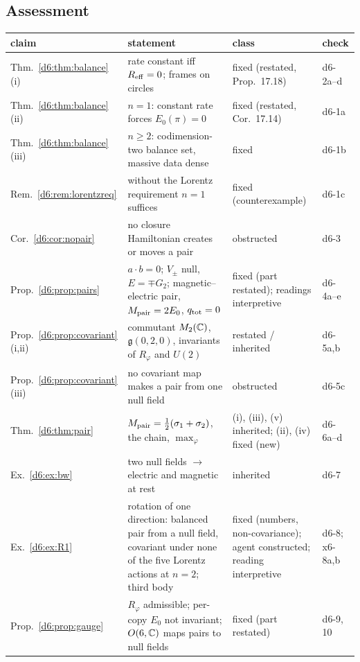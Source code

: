 \subsection{Assessment}
\label{d6:sec:assess}

\begin{table}[t]
\centering
\small
\begin{tabular}{@{}>{\raggedright\arraybackslash}p{2.7cm}>{\raggedright\arraybackslash}p{7.2cm}>{\raggedright\arraybackslash}p{3.2cm}>{\raggedright\arraybackslash}p{1.4cm}@{}}
\toprule
claim & statement & class & check\\
\midrule
Thm.~\ref{d6:thm:balance}(i) & rate constant iff $R_{\rm eff}=0$; frames on circles & fixed (restated, Prop.~17.18) & d6-2a--d\\
Thm.~\ref{d6:thm:balance}(ii) & $n=1$: constant rate forces $E_0(\pi)=0$ & fixed (restated, Cor.~17.14) & d6-1a\\
Thm.~\ref{d6:thm:balance}(iii) & $n\ge2$: codimension-two balance set, massive data dense & fixed & d6-1b\\
Rem.~\ref{d6:rem:lorentzreq} & without the Lorentz requirement $n=1$ suffices & fixed (counterexample) & d6-1c\\
Cor.~\ref{d6:cor:nopair} & no closure Hamiltonian creates or moves a pair & obstructed & d6-3\\
Prop.~\ref{d6:prop:pairs} & $a\cdot b=0$; $V_\pm$ null, $E=\mp G_2$; magnetic--electric pair, $M_{\rm pair}=2E_0$, $q_{\rm tot}=0$ & fixed (part restated); readings interpretive & d6-4a--e\\
Prop.~\ref{d6:prop:covariant}(i,ii) & commutant $M_2(\mathbb{C})$, $\mathfrak g(0,2,0)$, invariants of $R_\varphi$ and $U(2)$ & restated / inherited & d6-5a,b\\
Prop.~\ref{d6:prop:covariant}(iii) & no covariant map makes a pair from one null field & obstructed & d6-5c\\
Thm.~\ref{d6:thm:pair} & $M_{\rm pair}=\tfrac12(\sigma_1+\sigma_2)$, the chain, $\max_\varphi$ & (i), (iii), (v) inherited; (ii), (iv) fixed (new) & d6-6a--d\\
Ex.~\ref{d6:ex:bw} & two null fields $\to$ electric and magnetic at rest & inherited & d6-7\\
Ex.~\ref{d6:ex:R1} & rotation of one direction: balanced pair from a null field, covariant under none of the five Lorentz actions at $n=2$; third body & fixed (numbers, non-covariance); agent constructed; reading interpretive & d6-8; x6-8a,b\\
Prop.~\ref{d6:prop:gauge} & $R_\varphi$ admissible; per-copy $E_0$ not invariant; $O(6,\mathbb{C})$ maps pairs to null fields & fixed (part restated) & d6-9, 10\\

\end{tabular}
\end{table}
